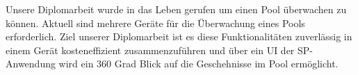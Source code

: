 Unsere Diplomarbeit wurde in das Leben gerufen um einen Pool überwachen zu können.
Aktuell sind mehrere Geräte für die Überwachung eines Pools erforderlich.
Ziel unserer Diplomarbeit ist es diese Funktionalitäten zuverlässig in einem Gerät kosteneffizient zusammenzuführen und über ein UI der SP-Anwendung wird ein 360 Grad Blick auf die Geschehnisse im Pool ermöglicht. 